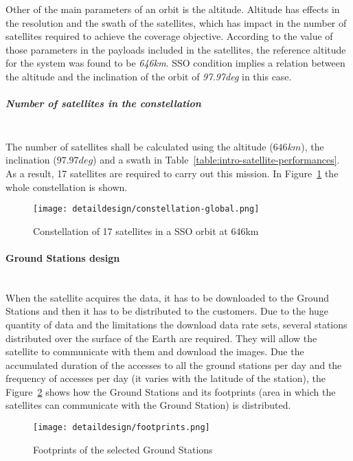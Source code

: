 Other of the main parameters of an orbit is the altitude. Altitude has effects in the resolution and the swath of the satellites, which has impact in the number of satellites required to achieve the coverage objective. According to the value of those parameters in the payloads included in the satellites, the reference altitude for the system was found to be \emph{646km}. \acs{SSO} condition implies a relation between the altitude and the inclination of the orbit of \emph{97.97deg} in this case.

\subparagraph{Number of satellites in the constellation}~\\
The number of satellites shall be calculated using the altitude ($646 km$), the
inclination ($97.97 deg$) and a swath in
Table~\ref{table:intro-satellite-performances}. As a result, 17 satellites are
required to carry out this mission. In Figure~\ref{fig:intr-constellation-global} the whole constellation is
shown.

\begin{figure}[!h]
\begin{center}
\texttt{[image: detaildesign/constellation-global.png]}
\caption{Constellation of 17 satellites in a SSO orbit at 646km}
\label{fig:intr-constellation-global}
\end{center}
\end{figure}

\paragraph{Ground Stations design}~\\
When the satellite acquires the data, it has to be downloaded to the Ground
Stations and then it has to be distributed to the customers. Due to the huge
quantity of data and the limitations the download data rate sets, several
stations distributed over the surface of the Earth are required. They will allow
the satellite to communicate with them and download the images. Due the
accumulated duration of the accesses to all the ground stations per day and the
frequency of accesses per day (it varies with the latitude of the station), the
Figure~\ref{fig:intr-footprints} shows how the Ground Stations and its
footprints (area in which the satellites can communicate with the Ground
Station) is distributed.


\begin{figure}[!h]
\begin{center}
\texttt{[image: detaildesign/footprints.png]}
\caption{Footprints of the selected Ground Stations}
\label{fig:intr-footprints}
\end{center}
\end{figure}

